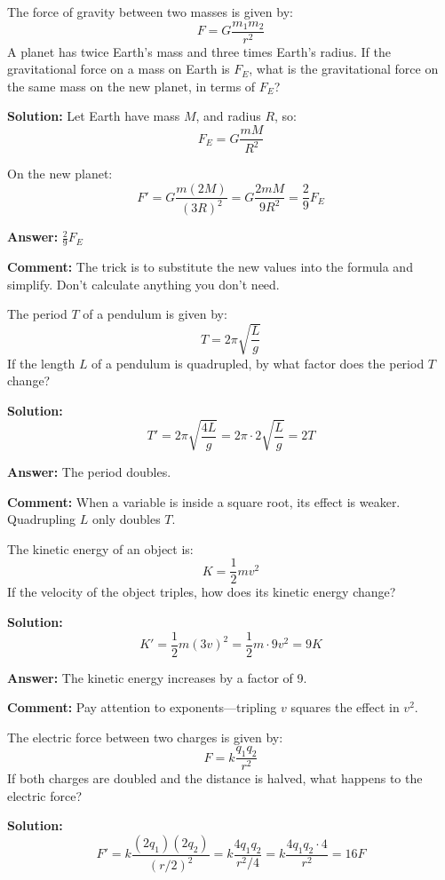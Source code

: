 	The force of gravity between two masses is given by:
	\[
	F = G \frac{m_1 m_2}{r^2}
	\]
	A planet has twice Earth’s mass and three times Earth’s radius. If the gravitational force on a mass on Earth is \( F_E \), what is the gravitational force on the same mass on the new planet, in terms of \( F_E \)?


\textbf{Solution:} Let Earth have mass \( M \), and radius \( R \), so:
\[
F_E = G \frac{m M}{R^2}
\]

On the new planet:
\[
F' = G \frac{m (2M)}{(3R)^2} = G \frac{2mM}{9R^2} = \frac{2}{9} F_E
\]

\textbf{Answer:} \( \frac{2}{9} F_E \)

\textbf{Comment:} The trick is to substitute the new values into the formula and simplify. Don’t calculate anything you don’t need.

\vspace{1em}

	The period \( T \) of a pendulum is given by:
	\[
	T = 2\pi \sqrt{\frac{L}{g}}
	\]
	If the length \( L \) of a pendulum is quadrupled, by what factor does the period \( T \) change?


\textbf{Solution:}
\[
T' = 2\pi \sqrt{\frac{4L}{g}} = 2\pi \cdot 2\sqrt{\frac{L}{g}} = 2T
\]

\textbf{Answer:} The period doubles.

\textbf{Comment:} When a variable is inside a square root, its effect is weaker. Quadrupling \( L \) only doubles \( T \).

\vspace{1em}

	The kinetic energy of an object is:
	\[
	K = \frac{1}{2}mv^2
	\]
	If the velocity of the object triples, how does its kinetic energy change?


\textbf{Solution:}
\[
K' = \frac{1}{2} m (3v)^2 = \frac{1}{2} m \cdot 9v^2 = 9K
\]

\textbf{Answer:} The kinetic energy increases by a factor of 9.

\textbf{Comment:} Pay attention to exponents—tripling \( v \) squares the effect in \( v^2 \).

\vspace{1em}

	The electric force between two charges is given by:
	\[
	F = k \frac{q_1 q_2}{r^2}
	\]
	If both charges are doubled and the distance is halved, what happens to the electric force?


\textbf{Solution:}
\[
F' = k \frac{(2q_1)(2q_2)}{(r/2)^2} = k \frac{4q_1 q_2}{r^2/4} = k \frac{4q_1 q_2 \cdot 4}{r^2} = 16F
\]


